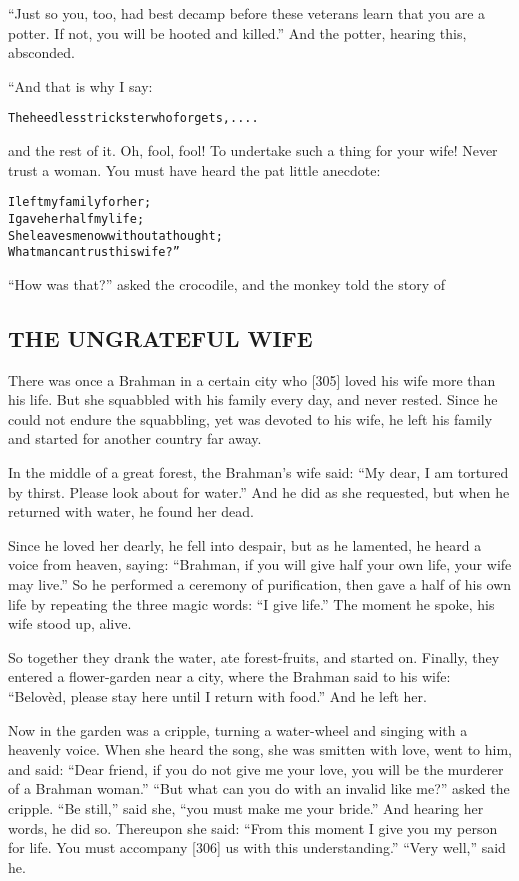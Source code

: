 \documentclass{article}
\renewenvironment{verbatim}{\begin{alltt}\normalfont\begin{centering}}{\end{centering}\end{alltt}}
\begin{document}
``Just so you, too, had best decamp before these veterans learn that you are a potter. If not, you will be hooted and killed.''
And the potter, hearing this, absconded.

“And that is why I say:

\begin{verbatim}
The heedless trickster who forgets, ....
\end{verbatim}
and the rest of it. Oh, fool, fool! To undertake such a thing for
your wife! Never trust a woman. You must have heard the pat little
anecdote:

\begin{verbatim}
I left my family for her;
    I gave her half my life;
She leaves me now without a thought;
    What man can trust his wife?”
\end{verbatim}
``How was that?'' asked the crocodile, and the monkey told the
story of

\subsection{THE UNGRATEFUL WIFE}

There was once a Brahman in a certain city who [305] loved his wife
more than his life. But she squabbled with his family every day,
and never rested. Since he could not endure the squabbling, yet was
devoted to his wife, he left his family and started for another
country far away.

In the middle of a great forest, the Brahman's wife said:
``My dear, I am tortured by thirst. Please look about for water.''
And he did as she requested, but when he returned with water, he
found her dead.

Since he loved her dearly, he fell into despair, but as he
lamented, he heard a voice from heaven, saying:
``Brahman, if you will give half your own life, your wife may live.''
So he performed a ceremony of purification, then gave a half of his
own life by repeating the three magic words: ``I give life.'' The
moment he spoke, his wife stood up, alive.

So together they drank the water, ate forest-fruits, and started
on. Finally, they entered a flower-garden near a city, where the
Brahman said to his wife:
``Belovèd, please stay here until I return with food.'' And he left
her.

Now in the garden was a cripple, turning a water-wheel and singing
with a heavenly voice. When she heard the song, she was smitten
with love, went to him, and said:
``Dear friend, if you do not give me your love, you will be the murderer of a Brahman woman.''
``But what can you do with an invalid like me?'' asked the cripple.
``Be still,'' said she, ``you must make me your bride.'' And
hearing her words, he did so. Thereupon she said:
``From this moment I give you my person for life. You must accompany [306] us with this understanding.''
``Very well,'' said he.
\end{document}

